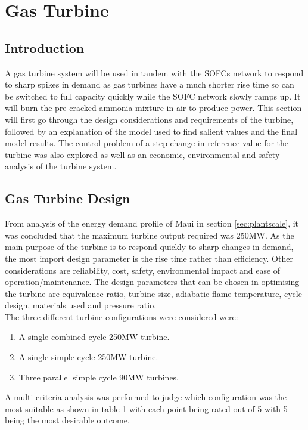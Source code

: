 \documentclass[11pt, oneside]{article}
\begin{document}
\section{Gas Turbine}

\subsection{Introduction}\label{sec:intro}
A gas turbine system will be used in tandem with the SOFCs network to respond to sharp spikes in demand as gas turbines have a much shorter rise time so can be switched to full capacity quickly while the SOFC network slowly ramps up. It will burn the pre-cracked ammonia mixture in air to produce power. This section will first go through the design considerations and requirements of the turbine, followed by an explanation of the model used to find salient values and the final model results. The control problem of a step change in reference value for the turbine was also explored as well as an economic, environmental and safety analysis of the turbine system.

\subsection{Gas Turbine Design}
From analysis of the energy demand profile of Maui in section \ref{sec:plantscale}, it was concluded that the maximum turbine output required was 250MW. As the main purpose of the turbine is to respond quickly to sharp changes in demand, the most import design parameter is the rise time rather than efficiency. Other considerations are reliability, cost, safety, environmental impact and ease of operation/maintenance. The design parameters that can be chosen in optimising the turbine are equivalence ratio, turbine size, adiabatic flame temperature, cycle design, materials used and pressure ratio.\\The three different turbine configurations were considered were: %
\begin {enumerate}
\item A single combined cycle 250MW turbine.
\item A single simple cycle 250MW turbine. 
\item Three parallel simple cycle 90MW turbines. 
\end {enumerate}
A multi-criteria analysis was performed to judge which configuration was the most suitable as shown in table 1 with each point being rated out of 5 with 5 being the most desirable outcome. 
\end{document}
